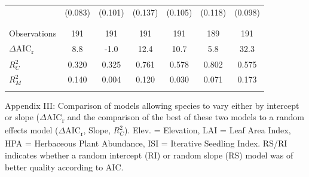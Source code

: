 \documentclass[a4paper,10pt,]{report}
\begin{document}
\begin{table}[!htbp]
\begin{adjustwidth}{-0.8cm}{-0.5cm}
\begin{center}
\begin{tabular}{@{\extracolsep{0pt}}l@{\hspace{-2pt}}SSSSSS}
  & (0.083) & (0.101) & (0.137) & (0.105) & (0.118) & (0.098) \\ 
  & & & & & & \\ 
\hline \\[-1.8ex] 
Observations & 191 & 191 & 191 & 191 & 189 & 191 \\ 
$\Delta$AIC\textsubscript{r} & 8.8 & -1.0 & 12.4 & 10.7 & 5.8 & 32.3 \\ 
$R_C^2$ &0.320 &0.325 &0.761 &0.578 & 0.802 &0.575 \\
$R_M^2$ &0.140 &0.004 &0.120 &0.030 &0.071 &0.173 \\
\hline 
\hline \\[-1.8ex] 
\end{tabular}
\end{center}
\end{adjustwidth} 
\end{table}
\clearpage
Appendix III: Comparison of models allowing species to vary either by intercept or slope ($\Delta$AIC\textsubscript{r} and the comparison of the best of these two models to a random effects model ($\Delta$AIC\textsubscript{r}, Slope, $R_C^2$). Elev. = Elevation, LAI = Leaf Area Index, HPA = Herbaceous Plant Abundance, ISI = Iterative Seedling Index. RS/RI indicates whether a random intercept (RI) or random slope (RS) model was of better quality according to AIC.
\end{document}

